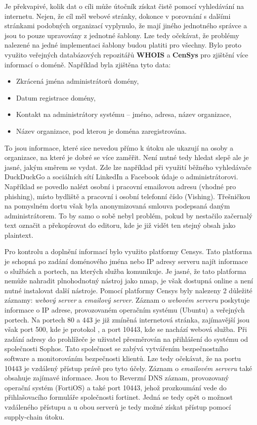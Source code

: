 Je překvapivé, kolik dat o cíli může útočník získat čistě pomocí vyhledávání na internetu.
Nejen, že cíl měl webové stránky, dokonce v porovnání s dalšími stránkami podobných organizací vyplynulo, že mají jiného jednotného správce a jsou to pouze upravovány z jednotné šablony.
Lze tedy očekávat, že problémy nalezené na jedné implementaci šablony budou platiti pro všechny.
Bylo proto využito veřejných databázových repozitářů \textbf{WHOIS} a \textbf{CenSys} pro zjištění více informací o doméně.
Například byla zjištěna tyto data:
\begin{itemize}
	\item Zkrácená jména administrátorů domény,
	\item Datum registrace domény,
	\item Kontakt na administrátory systému – jméno, adresa, název organizace,
	\item Název organizace, pod kterou je doména zaregistrována.
\end{itemize}

To jsou informace, které sice nevedou přímo k útoku ale ukazují na osoby a organizace, na které je dobré se více zaměřit.
Není nutné tedy hledat slepě ale je jasné, jakým směrem se vydat.
Zde lze například při využití běžného vyhledávače DuckDuckGo a sociálních sítí LinkedIn a Facebook údaje o administrátorovi.
Například se povedlo nalézt osobní i pracovní emailovou adresu (vhodné pro phishing), místo bydliště a pracovní i osobní telefonní číslo (Vishing).
Třešničkou na pomyslném dortu však byla anonymizovaná smlouva podepsaná daným administrátorem.
To by samo o sobě nebyl problém, pokud by nestačilo začernalý text označit a překopírovat do editoru, kde je již vidět ten stejný obsah jako plaintext.

Pro kontrolu a doplnění informací bylo využito platformy Censys.
Tato platforma je schopná po zadání doménového jména nebo IP adresy serveru najít informace o službách a portech, na kterých služba komunikuje.
Je jasné, že tato platforma nemůže nahradit plnohodnotný nástroj jako nmap, je však dostupná online a není nutné instalovat další nástroje.
Pomocí platformy Censys byly nalezeny 2 důležité záznamy: \textit{webový server} a \textit{emailový server}.
Záznam o \textit{webovém serveru} poskytuje informace o IP adrese, provozovaném operačním systému (Ubuntu) a veřejných portech.
Na portech 80 a 443 je již zmíněná internetová stránka, zajímavější jsou však port 500, kde je protokol , a port 10443, kde se nachází webová služba.
Při zadání adresy do prohlížeče je  uživatel přesměrován na přihlášení do systému od společnosti Sophos.
Tato společnost se zabývá vytvářením bezpečnostního software a monitorováním bezpečnosti klientů.
Lze tedy očekávat, že na portu 10443 je vzdálený přístup právě pro tyto účely.
Záznam o \textit{emailovém serveru} také obsahuje zajímavé informace.
Jsou to Reverzní DNS záznam, provozovaný operační systém (FortiOS) a také port 10443, jehož prozkoumání vede do přihlašovacího formuláře společnosti fortinet.
Jedná se tedy opět o možnost vzdáleného přístupu a u obou serverů je tedy možné získat přístup pomocí supply-chain útoku.

